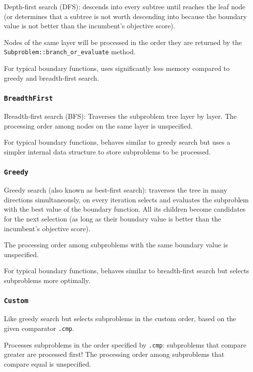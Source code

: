 Depth-first search (DFS): descends into every subtree until reaches the leaf node (or determines that a subtree is not worth descending into because the boundary value is not better than the incumbent’s objective score).

Nodes of the same layer will be processed in the order they are returned by the \texttt{Subproblem::branch\_or\_evaluate} method.

For typical boundary functions, uses significantly less memory compared to greedy and breadth-first search.

\subsubsection*{\texttt{BreadthFirst}}

Breadth-first search (BFS): Traverses the subproblem tree layer by layer. The processing order among nodes on the same layer is unspecified.

For typical boundary functions, behaves similar to greedy search but uses a simpler internal data structure to store subproblems to be processed.

\subsubsection*{\texttt{Greedy}}

Greedy search (also known as best-first search): traverses the tree in many directions simultaneously, on every iteration selects and evaluates the subproblem with the best value of the boundary function. All its children become candidates for the next selection (as long as their boundary value is better than the incumbent’s objective score).

The processing order among subproblems with the same boundary value is unspecified.

For typical boundary functions, behaves similar to breadth-first search but selects subproblems more optimally.

\subsubsection*{\texttt{Custom}}

Like greedy search but selects subproblems in the custom order, based on the given comparator \texttt{.cmp}.

Processes subproblems in the order specified by \texttt{.cmp}: subproblems that compare greater are processed first! The processing order among subproblems that compare equal is unspecified.

